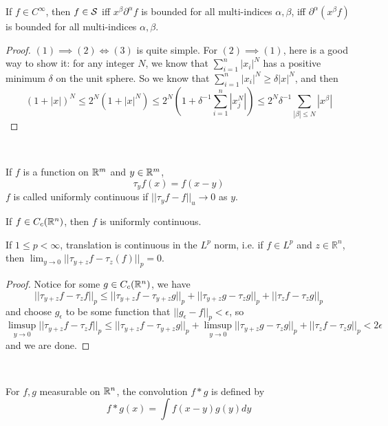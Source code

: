 \begin{proposition}
    If $f\in C^{\infty}$, then $f\in \mathcal{S}$ iff $x^{\beta}\partial^{\alpha}f$ is bounded for all multi-indices $\alpha,\beta$, iff $\partial^{\alpha}(x^{\beta}f)$ is bounded for all multi-indices $\alpha,\beta$.
\end{proposition}
\begin{proof}
    $(1) \implies (2) \Leftrightarrow (3)$ is quite simple. For $(2) \implies (1)$, here is a good way to show it: for any integer $N$, we know that $\sum\limits_{i=1}^n|x_i|^N$ has a positive minimum $\delta$ on the unit sphere. So we know that $\sum\limits_{i=1}^n |x_i|^N \geq \delta|x|^N$, and then
    \[
    (1+|x|)^N \leq 2^N(1+|x|^N) \leq 2^N(1+\delta^{-1}\sum\limits_{i=1}^n |x_j^N|) \leq 2^N\delta^{-1}\sum\limits_{|\beta| \leq N}|x^{\beta}|
    \]
\end{proof}

\begin{definition}\ \par
    If $f$ is a function on $\mathbb{R}^m$ and $y\in \mathbb{R}^m$,
    \[\tau_y f(x) = f(x-y)\]
    $f$ is called uniformly continuous if $||\tau_y f - f||_u \to 0$ as $y$.
\end{definition}

\begin{lemma}
    If $f\in C_c(\mathbb{R}^n)$, then $f$ is uniformly continuous.
\end{lemma}

\begin{proposition}
    If $1\leq p <\infty$, translation is continuous in the $L^p$ norm, i.e. if $f\in L^p$ and $z\in \mathbb{R}^n$, then $\lim_{y\to 0} ||\tau_{y+z}f - \tau_z(f)||_p = 0$.
\end{proposition}
\begin{proof}
    Notice for some $g\in C_c(\mathbb{R}^n)$, we have
    \[
    ||\tau_{y+z}f-\tau_zf||_p \leq ||\tau_{y+z} f - \tau_{y+z}g||_p + ||\tau_{y+z}g-\tau_z g||_p + ||\tau_z f- \tau_z g||_p
    \]
    and choose $g_{\epsilon}$ to be some function that $||g_{\epsilon}-f||_p < \epsilon$, so
    \[
    \limsup_{y\to 0} ||\tau_{y+z}f-\tau_zf||_p \leq ||\tau_{y+z} f - \tau_{y+z}g||_p + \limsup_{y\to 0} ||\tau_{y+z}g-\tau_z g||_p + ||\tau_z f- \tau_z g||_p < 2\epsilon
    \]
    and we are done.
\end{proof}

\begin{definition}[Convolution]\ \par
    For $f,g$ measurable on $\mathbb{R}^n$, the convolution $f*g$ is defined by
    \[
    f*g(x) = \int f(x-y)g(y)dy
    \]
\end{definition}

